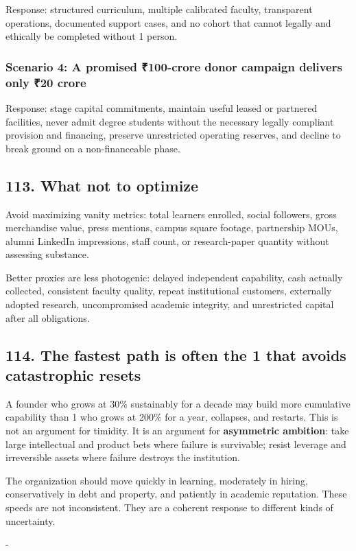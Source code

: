 Response: structured curriculum, multiple calibrated faculty, transparent operations, documented support cases, and no cohort that cannot legally and ethically be completed without 1 person.

\subsubsection*{Scenario 4: A promised \textnormal{₹}100-crore donor campaign delivers only \textnormal{₹}20 crore}

Response: stage capital commitments, maintain useful leased or partnered facilities, never admit degree students without the necessary legally compliant provision and financing, preserve unrestricted operating reserves, and decline to break ground on a non-financeable phase.

\subsection{113. What not to optimize}

Avoid maximizing vanity metrics: total learners enrolled, social followers, gross merchandise value, press mentions, campus square footage, partnership MOUs, alumni LinkedIn impressions, staff count, or research-paper quantity without assessing substance.

Better proxies are less photogenic: delayed independent capability, cash actually collected, consistent faculty quality, repeat institutional customers, externally adopted research, uncompromised academic integrity, and unrestricted capital after all obligations.

\subsection{114. The fastest path is often the 1 that avoids catastrophic resets}

A founder who grows at 30\% sustainably for a decade may build more cumulative capability than 1 who grows at 200\% for a year, collapses, and restarts. This is not an argument for timidity. It is an argument for \textbf{asymmetric ambition}: take large intellectual and product bets where failure is survivable; resist leverage and irreversible assets where failure destroys the institution.

The organization should move quickly in learning, moderately in hiring, conservatively in debt and property, and patiently in academic reputation. These speeds are not inconsistent. They are a coherent response to different kinds of uncertainty.

-


